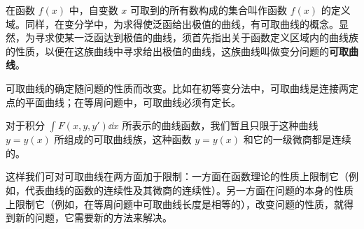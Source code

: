 在函数 $f(x)$ 中，自变数 $x$ 可取到的所有数构成的集合叫作函数 $f(x)$ 的定义域。同样，在变分学中，为求得使泛函给出极值的曲线，有可取曲线的概念。显然，为寻求使某一泛函达到极值的曲线，须首先指出关于函数定义区域内的曲线族的性质，以便在这族曲线中寻求给出极值的曲线，这族曲线叫做变分问题的\textbf{可取曲线}。

可取曲线的确定随问题的性质而改变。比如在初等变分法中，可取曲线是连接两定点的平面曲线；在等周问题中，可取曲线必须有定长。

对于积分 $\int F(x,y,y')\dd x$ 所表示的曲线函数，我们暂且只限于这种曲线 $y=y(x)$ 所组成的可取曲线族，这种函数 $y=y(x)$ 和它的一级微商都是连续的。

这样我们可对可取曲线在两方面加于限制：一方面在函数理论的性质上限制它（例如，代表曲线的函数的连续性及其微商的连续性）。另一方面在问题的本身的性质上限制它（例如，在等周问题中可取曲线长度是相等的），改变问题的性质，就得到新的问题，它需要新的方法来解决。